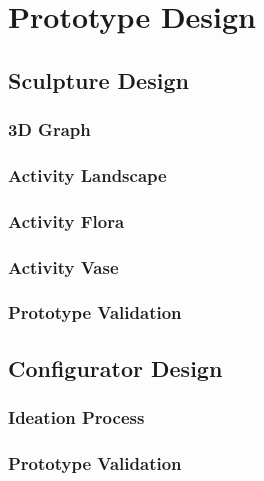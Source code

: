 \documentclass[../medieninformatik-arbeit.tex]{subfiles}
\begin{document}
\label{ch:proto}
\section{Prototype Design}



\subsection{Sculpture Design}

\subsubsection{3D Graph}

\subsubsection{Activity Landscape}

\subsubsection{Activity Flora}

\subsubsection{Activity Vase}

\subsubsection{Prototype Validation}


\subsection{Configurator Design}

\subsubsection{Ideation Process}

\subsubsection{Prototype Validation}
\end{document}
